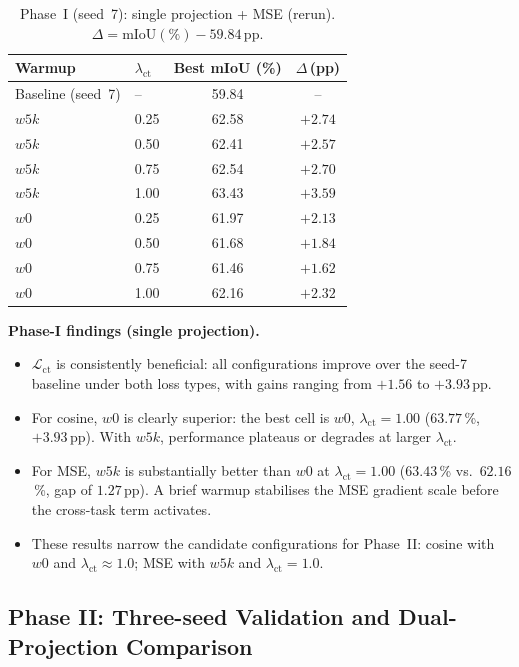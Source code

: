 \begin{table}[H]
\centering
\caption{Phase~I (seed~7): single projection + MSE (rerun).
$\Delta = \text{mIoU}(\%) - 59.84$\,pp.}
\label{tab:ct-p1-single-mse}
\renewcommand{\arraystretch}{1.2}
\begin{tabular}{llcc}
\toprule
Warmup & $\lambda_\text{ct}$ & Best mIoU (\%) & $\Delta$\,(pp) \\
\midrule
Baseline (seed~7) & -- & 59.84 & -- \\
\midrule
$w5k$ & 0.25 & 62.58 & $+2.74$ \\
$w5k$ & 0.50 & 62.41 & $+2.57$ \\
$w5k$ & 0.75 & 62.54 & $+2.70$ \\
$w5k$ & 1.00 & 63.43 & $+3.59$ \\
\midrule
$w0$  & 0.25 & 61.97 & $+2.13$ \\
$w0$  & 0.50 & 61.68 & $+1.84$ \\
$w0$  & 0.75 & 61.46 & $+1.62$ \\
$w0$  & 1.00 & 62.16 & $+2.32$ \\
\bottomrule
\end{tabular}
\end{table}

\noindent
\textbf{Phase-I findings (single projection).}
\begin{itemize}
\item $\mathcal{L}_\text{ct}$ is consistently beneficial: all
  configurations improve over the seed-7 baseline under both loss types,
  with gains ranging from $+1.56$ to $+3.93$\,pp.
\item For cosine, $w0$ is clearly superior: the best cell is
  $w0$, $\lambda_\text{ct}=1.00$ ($63.77$\,\%, $+3.93$\,pp). With $w5k$,
  performance plateaus or degrades at larger $\lambda_\text{ct}$.
\item For MSE, $w5k$ is substantially better than $w0$ at
  $\lambda_\text{ct}=1.00$ ($63.43$\,\% vs.\ $62.16$\,\%, gap of $1.27$\,pp).
  A brief warmup stabilises the MSE gradient scale before the cross-task
  term activates.
\item These results narrow the candidate configurations for Phase~II:
  cosine with $w0$ and $\lambda_\text{ct}\approx1.0$; MSE with $w5k$
  and $\lambda_\text{ct}=1.0$.
\end{itemize}

\subsection{Phase II: Three-seed Validation and Dual-Projection Comparison}
\label{subsec:ct-phase2-3seeds}

